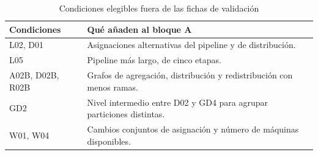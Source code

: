 \begin{table}[htbp]\centering\small
\caption{Condiciones elegibles fuera de las fichas de validación}
\label{tab:fuera_contrastes}
\begin{tabularx}{\linewidth}{@{}P{3.3cm}Y@{}}
\toprule Condiciones & Qué añaden al bloque A\\\midrule
L02, D01 & Asignaciones alternativas del pipeline y de distribución.\\
L05 & Pipeline más largo, de cinco etapas.\\
A02B, D02B, R02B & Grafos de agregación, distribución y redistribución con menos ramas.\\
GD2 & Nivel intermedio entre D02 y GD4 para agrupar particiones distintas.\\
W01, W04 & Cambios conjuntos de asignación y número de máquinas disponibles.\\
\bottomrule
\end{tabularx}
\end{table}
